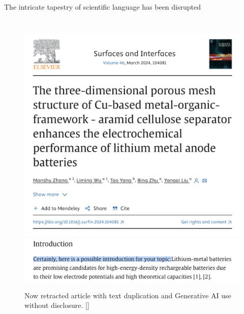 \documentclass[10pt]{beamer}
\newcommand{\citeme}[1]{{\xspace\color{scAqua} \scriptsize [\cite{#1}]}}
\begin{document}
\begin{frame}{The intricate tapestry of scientific language has been disrupted}
	\begin{columns}[T,onlytextwidth]
		\hspace*{-0.7cm} 
		\begin{figure}
			\includegraphics[width=\textwidth]{figures/ZhangTitle.png}
			\includegraphics[width=\textwidth]{figures/ZhangAbstractCrop.png}
			\caption{Now retracted article with text duplication and Generative AI use without disclosure.\citeme{Zhang2024}}
		\end{figure}

		

\end{columns}
\end{frame}
\end{document}
